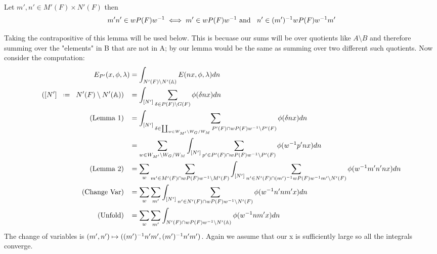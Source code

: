     \begin{Lemma}\label{lem:2}
        Let \(m', n'\in M'(F)\times N'(F)\) then 
        \[m'n' \in wP(F)w^{-1} \iff m'\in wP(F)w^{-1} \text{ and  }\;\; n'\in (m')^{-1} wP(F)w^{-1} m'\]
    \end{Lemma}
    Taking the contrapositive of this lemma will be used below. This is becuase our sums will be over quotients like \(A\setminus B\) and therefore summing over the "elements" in B that are not in A; by our lemma would be the same as summing over two different such quotients.
    Now consider the computation:
    \begin{equation*}
        \begin{aligned}
            E_{P'}(x, \phi, \lambda) &= \int_{N'(F)\setminus N'(\A)} E(nx, \phi, \lambda) dn\\
                                    ([N']\defeq N'(F)\setminus N'(\A)) \;\;\; &= \int_{[N']} \sum_{\delta\in P(F)\setminus G(F)} \phi(\delta nx)  dn\\
                                    (\text{Lemma 1}) \;\;\; &= \int_{[N']} \sum_{\delta\in \coprod_{w\in W_{M'}\setminus W_G / W_{M}} P'(F)\cap wP(F)w\inv \setminus P'(F)} \phi(\delta nx)  dn\\
                                     &= \sum_{ w\in W_{M'}\setminus W_G / W_{M}}\int_{[N']} \sum_{p'\in P'(F)\cap wP(F)w\inv \setminus P'(F)} \phi( w\inv p'nx)  dn\\
                                    (\text{Lemma 2}) \;\;\; &= \sum_{ w} \sum_{m'\in M'(F)\cap wP(F)w\inv\setminus M'(F)} \int_{[N']} \sum_{n'\in N'(F)\cap (m')\inv wP(F)w\inv m' \setminus N'(F)} \phi( w\inv m'n'nx)  dn\\
                                    (\text{Change Var}) \;\;\; &= \sum_{ w} \sum_{m'} \int_{[N']} \sum_{n'\in N'(F)\cap wP(F)w\inv\setminus N'(F) } \phi( w\inv n'nm'x)  dn\\
                                    (\text{Unfold}) \;\;\; &= \sum_{ w} \sum_{m'} \int_{N'(F)\cap wP(F)w\inv \setminus N'(\A)} \phi( w\inv nm' x)  dn\\
        \end{aligned}
    \end{equation*}
    The change of variables is \((m', n') \mapsto ((m')^{-1} n' m', (m')^{-1} n' m')\).
    Again we assume that our x is sufficiently large so all the integrals converge.

